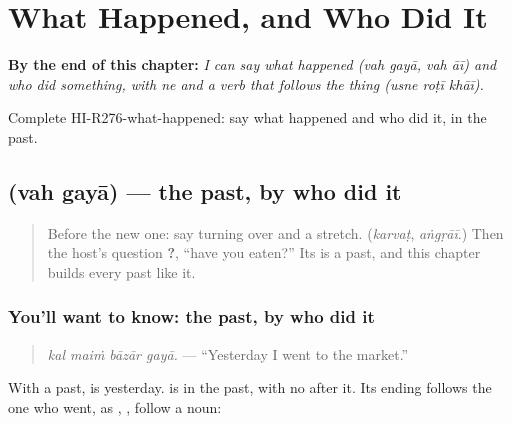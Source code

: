 
\chapter{What Happened, and Who Did It}
\label{ch:hi-what-happened-and-who-did-it}

\begin{chapteropening}
\textbf{By the end of this chapter:} \emph{I can say what happened (vah gayā, vah āī) and who did something, with ne and a verb that follows the thing (usne roṭī khāī).}

Complete HI-R276-what-happened: say what happened and who did it, in the past.
\end{chapteropening}

\section[\texorpdfstring{\hi{वह} \hi{गया} (vah gayā)}{वह गया (vah gayā)}]{  (vah gayā) — the past, by who did it}

\label{lesson:HI-C276-vahgaya}



\begin{quote}
Before the new one: say turning over and a stretch. (\emph{karvaṭ}, \emph{aṅgṛāī}.) Then the host's question \textbf{ ?}, \textquotedblleft{}have you eaten?\textquotedblright{} Its \textbf{} is a past, and this chapter builds every past like it.
\end{quote}

\subsection*{You'll want to know: the past, by who did it}
\begin{quote}
\textbf{   }
\end{quote}

\begin{quote}
\emph{kal maiṁ bāzār gayā.} — \textquotedblleft{}Yesterday I went to the market.\textquotedblright{}
\end{quote}

With a past, \textbf{} is yesterday. \textbf{} is \textbf{} in the past, with no \textbf{} after it. Its ending follows the one who went, as \textbf{}, \textbf{}, \textbf{} follow a noun:


